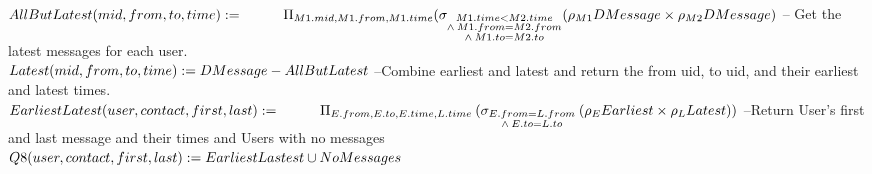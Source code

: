 \documentclass{article}
\begin{document}
\begin{enumerate}
{$
AllButLatest(mid, from, to, time) := \\ 
\hspace*{1cm} \Pi_{M1.mid, M1.from, M1.time} (\sigma_{\substack{M1.time < M2.time \\
					\wedge \: M1.from = M2.from \\
					\wedge \: M1.to = M2.to}}
					(\rho_{M1} DMessage \times \rho_{M2} DMessage) \\\\\\
$
\hspace*{1cm} -- Get the latest messages for each user.  \\[5pt]
$
Latest(mid, from, to, time) := DMessage - AllButLatest \\\\ [5pt]
$
\hspace*{1cm} --Combine earliest and latest and return the from uid, to uid, and their earliest and latest times.  \\[5pt]
$
EarliestLatest(user, contact, first, last) := \\
\hspace*{1cm} \Pi_{E.from, E.to, E.time, L.time} \:
					 (\sigma_{\substack{E.from = L.from \\
					 \wedge \: E.to = L.to}} \: (\rho_{E}Earliest \times \rho_{L}Latest)) \\\\ [5pt]
$
\hspace*{1cm} --Return User's first and last message and their times and Users with no messages \\ [5pt]
$
Q8(user, contact, first, last) := EarliestLastest \cup NoMessages  \\ 
$
}


\end{enumerate}
\end{document}
